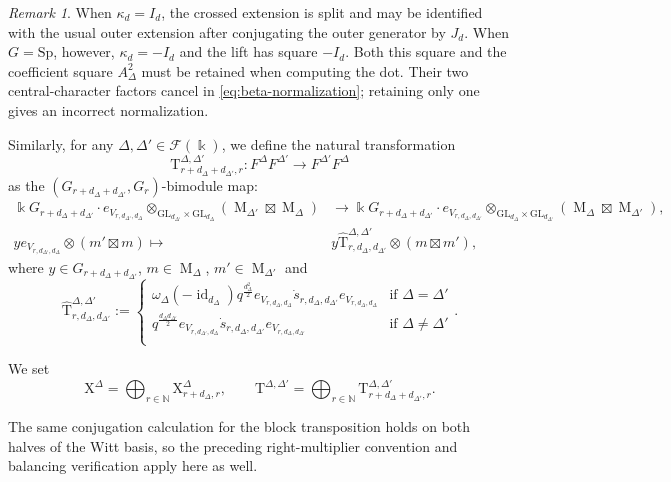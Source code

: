 \documentclass[12pt]{amsart}
\numberwithin{itemcounter}{subsection}
\theoremstyle{plain}
\theoremstyle{definition}
\theoremstyle{remark}
\newtheorem{remark}[theorem]{Remark}
\numberwithin{equation}{section}
\def\k{\Bbbk}
\def\Sp{\mathrm{Sp}}
\def\GL{\mathrm{GL}}
\def\M{{\operatorname{M}\nolimits}}
\def\id{\operatorname{id}\nolimits}
\begin{document}
\begin{remark}
When $\kappa_d=I_d$, the crossed extension is split and may be identified
with the usual outer extension after conjugating the outer generator by
$J_d$.  When $G=\Sp$, however, $\kappa_d=-I_d$ and the lift has square
$-I_d$.  Both this square and the coefficient square $A_\Delta^2$ must
be retained when computing the dot.  Their two central-character factors
cancel in \eqref{eq:beta-normalization}; retaining only one gives an
incorrect normalization.
\end{remark}

Similarly, for any $\Delta, \Delta' \in \mathcal{F}(\k)$, we define the natural transformation
\[
\mathrm{T}_{r+d_\Delta+d_{\Delta'},r}^{\Delta,\Delta'}: F^\Delta F^{\Delta'} \to F^{\Delta'} F^\Delta
\]
as the $(G_{r+d_\Delta+d_{\Delta'}}, G_r)$-bimodule map:
\[
\begin{aligned}
\k G_{r+d_\Delta+d_{\Delta'}} \cdot e_{V_{r,d_{\Delta'},d_\Delta}} \otimes_{\GL_{d_{\Delta'}} \times \GL_{d_\Delta}} (\M_{\Delta'} \boxtimes \M_\Delta) &\to \k G_{r+d_\Delta+d_{\Delta'}} \cdot e_{V_{r,d_\Delta,d_{\Delta'}}} \otimes_{\GL_{d_\Delta} \times \GL_{d_{\Delta'}}} (\M_\Delta \boxtimes \M_{\Delta'}), \\
y e_{V_{r,d_{\Delta'},d_\Delta}} \otimes (m' \boxtimes m) \mapsto &y \widehat{\mathrm{T}}^{\Delta,\Delta'}_{r,d_\Delta,d_{\Delta'}} \otimes (m \boxtimes m'),
\end{aligned}
\]
where $y \in G_{r+d_\Delta+d_{\Delta'}}$, $m \in \M_\Delta$, $m'\in \M_{\Delta'}$ and
\[
\widehat{\mathrm{T}}^{\Delta,\Delta'}_{r,d_\Delta,d_{\Delta'}}:=\begin{cases}
    \omega_\Delta(-\id_{d_\Delta}) q^{\frac{d_\Delta ^2}{2}}  e_{V_{r,d_{\Delta},d_\Delta}} \dot{s}_{r,d_\Delta,d_{\Delta'}} e_{V_{r,d_{\Delta},d_\Delta}} & \text{if $\Delta=\Delta'$}\\
    q^{\frac{d_\Delta d_{\Delta'}}{2}}  e_{V_{r,d_{\Delta'},d_\Delta}} \dot{s}_{r,d_\Delta,d_{\Delta'}} e_{V_{r,d_\Delta,d_{\Delta'}}} & \text{if $\Delta\neq \Delta'$}\\

\end{cases}
.\]

We set
\[
\mathrm{X}^\Delta = \bigoplus_{r \in \mathbb{N}} \mathrm{X}^\Delta_{r+d_\Delta,r}, \qquad
\mathrm{T}^{\Delta,\Delta'} = \bigoplus_{r \in \mathbb{N}} \mathrm{T}^{\Delta,\Delta'}_{r+d_\Delta+d_{\Delta'},r}.
\]

The same conjugation calculation for the block transposition holds on both halves of the Witt basis, so the preceding right-multiplier convention and balancing verification apply here as well.
\end{document}
